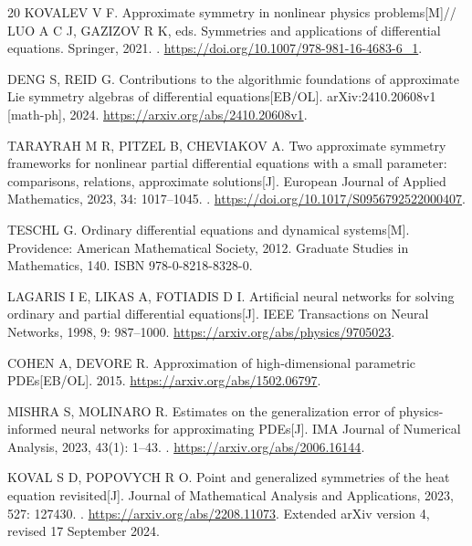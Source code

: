 \documentclass[11pt]{article}
\theoremstyle{definition}
\begin{document}
\begin{thebibliography}{20}
KOVALEV V F. Approximate symmetry in nonlinear physics problems[M]//
LUO A C J, GAZIZOV R K, eds. Symmetries and applications of differential
equations. Springer, 2021.
.
\url{https://doi.org/10.1007/978-981-16-4683-6_1}.

DENG S, REID G. Contributions to the algorithmic foundations of
approximate Lie symmetry algebras of differential equations[EB/OL].
arXiv:2410.20608v1 [math-ph], 2024.
\url{https://arxiv.org/abs/2410.20608v1}.

TARAYRAH M R, PITZEL B, CHEVIAKOV A. Two approximate symmetry frameworks
for nonlinear partial differential equations with a small parameter:
comparisons, relations, approximate solutions[J]. European Journal of
Applied Mathematics, 2023, 34: 1017--1045.
.
\url{https://doi.org/10.1017/S0956792522000407}.

TESCHL G. Ordinary differential equations and dynamical systems[M].
Providence: American Mathematical Society, 2012.
Graduate Studies in Mathematics, 140. ISBN 978-0-8218-8328-0.

LAGARIS I E, LIKAS A, FOTIADIS D I. Artificial neural networks for
solving ordinary and partial differential equations[J]. IEEE Transactions
on Neural Networks, 1998, 9: 987--1000.
\url{https://arxiv.org/abs/physics/9705023}.

COHEN A, DEVORE R. Approximation of high-dimensional parametric PDEs[EB/OL].
2015. \url{https://arxiv.org/abs/1502.06797}.

MISHRA S, MOLINARO R. Estimates on the generalization error of
physics-informed neural networks for approximating PDEs[J].
IMA Journal of Numerical Analysis, 2023, 43(1): 1--43.
.
\url{https://arxiv.org/abs/2006.16144}.

KOVAL S D, POPOVYCH R O. Point and generalized symmetries of the heat
equation revisited[J]. Journal of Mathematical Analysis and Applications,
2023, 527: 127430.
.
\url{https://arxiv.org/abs/2208.11073}.
Extended arXiv version 4, revised 17 September 2024.


\end{thebibliography}
\end{document}
